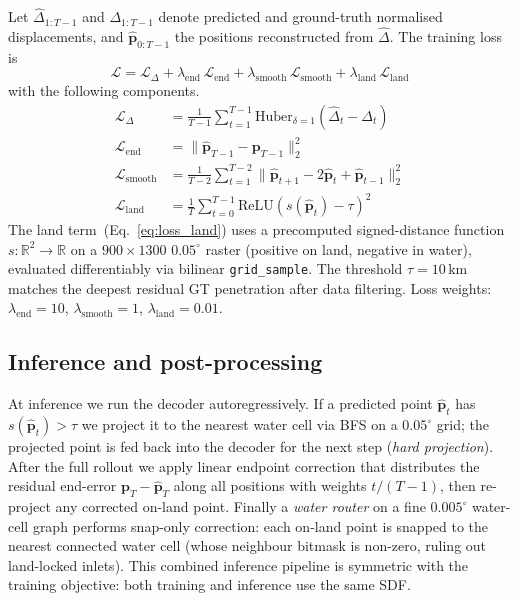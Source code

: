 \documentclass[11pt]{article}
\begin{document}
Let $\hat{\Delta}_{1:T-1}$ and $\Delta_{1:T-1}$ denote predicted and
ground-truth normalised displacements, and $\hat{\mathbf{p}}_{0:T-1}$ the
positions reconstructed from $\hat{\Delta}$. The training loss is
\begin{equation}
  \mathcal{L} = \mathcal{L}_\Delta
              + \lambda_{\text{end}}\,\mathcal{L}_{\text{end}}
              + \lambda_{\text{smooth}}\,\mathcal{L}_{\text{smooth}}
              + \lambda_{\text{land}}\,\mathcal{L}_{\text{land}}
\label{eq:loss_total}
\end{equation}
with the following components.
\begin{align}
  \mathcal{L}_\Delta      &= \frac{1}{T-1} \sum_{t=1}^{T-1}
                              \mathrm{Huber}_{\delta=1}\!\left(\hat{\Delta}_t - \Delta_t\right) \\
  \mathcal{L}_{\text{end}}    &= \|\hat{\mathbf{p}}_{T-1} - \mathbf{p}_{T-1}\|_2^2 \\
  \mathcal{L}_{\text{smooth}} &= \frac{1}{T-2} \sum_{t=1}^{T-2}
                              \|\hat{\mathbf{p}}_{t+1} - 2\hat{\mathbf{p}}_t + \hat{\mathbf{p}}_{t-1}\|_2^2 \\
  \mathcal{L}_{\text{land}}   &= \frac{1}{T} \sum_{t=0}^{T-1}
                              \mathrm{ReLU}\!\left(s(\hat{\mathbf{p}}_t) - \tau\right)^2
                              \label{eq:loss_land}
\end{align}
The land term~(Eq.~\ref{eq:loss_land}) uses a precomputed signed-distance
function $s : \mathbb{R}^2 \to \mathbb{R}$ on a $900 \times 1300$
$0.05^\circ$ raster (positive on land, negative in water), evaluated
differentiably via bilinear \texttt{grid\_sample}. The threshold
$\tau = 10\,\text{km}$ matches the deepest residual GT penetration after
data filtering. Loss weights: $\lambda_{\text{end}}=10$,
$\lambda_{\text{smooth}}=1$, $\lambda_{\text{land}}=0.01$.

\subsection{Inference and post-processing}
\label{sec:method:inference}

At inference we run the decoder autoregressively. If a predicted point
$\hat{\mathbf{p}}_t$ has $s(\hat{\mathbf{p}}_t) > \tau$ we project it to
the nearest water cell via BFS on a $0.05^\circ$ grid; the projected
point is fed back into the decoder for the next step (\emph{hard
projection}). After the full rollout we apply linear endpoint
correction that distributes the residual end-error
$\mathbf{p}_T - \hat{\mathbf{p}}_T$ along all positions with weights
$t/(T-1)$, then re-project any corrected on-land point. Finally a
\emph{water router} on a fine $0.005^\circ$ water-cell graph performs
snap-only correction: each on-land point is snapped to the nearest
connected water cell (whose neighbour bitmask is non-zero, ruling out
land-locked inlets). This combined inference pipeline is symmetric with
the training objective: both training and inference use the same SDF.
\end{document}
